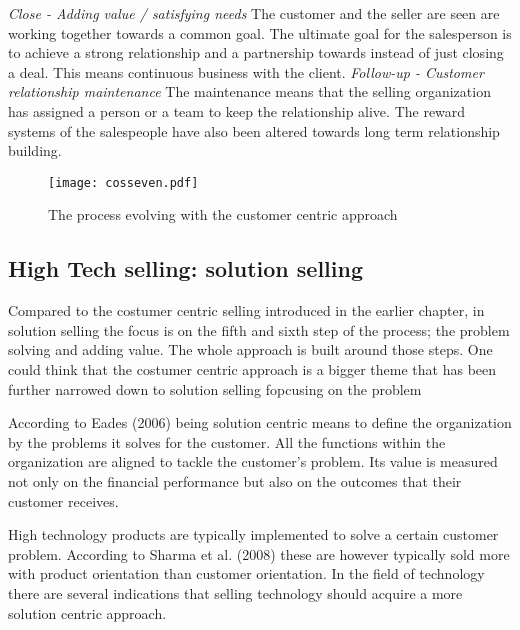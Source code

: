 \documentclass[12pt,a4paper,oneside,pdftex]{report}
\begin{document}
{{\emph{Close - Adding value / satisfying needs}\newline
The customer and the seller are seen are working together towards a common goal. The ultimate goal for the salesperson is to achieve a strong relationship and a partnership towards instead of just closing a deal. This means continuous business with the client. \citep{Moncrief} \newline \newline
\emph{Follow-up - Customer relationship maintenance}\newline
The maintenance means that the selling organization has assigned a person or a team to keep the relationship alive. The reward systems of the salespeople have also been altered towards long term relationship building.  \citep{Moncrief}
\begin{figure}[ht]
  \begin{center}
    \texttt{[image: cosseven.pdf]}
    \caption{The process evolving with the customer centric approach}
    \label{fig:cosseven}
  \end{center}
\end{figure}

\subsection{High Tech selling: solution selling}


Compared to the costumer centric selling introduced in the earlier chapter, in solution selling  the focus is on the fifth and sixth step of the process; the problem solving and adding value. The whole approach is built around those steps. One could think that the costumer centric approach is a bigger theme that has been further narrowed down to solution selling fopcusing on the problem

According to Eades (2006) being solution centric means to define the organization by the problems it solves for the customer. All the functions within the organization are aligned to tackle the customer's problem. Its value is measured not only on the financial performance but also on the outcomes that their customer receives. 

High technology products are typically implemented to solve a certain customer problem. According to Sharma et al. (2008) these are however typically sold more with product orientation than  customer orientation. In the field of technology there are several indications that selling technology should acquire a more solution centric approach.

}}
\end{document}

